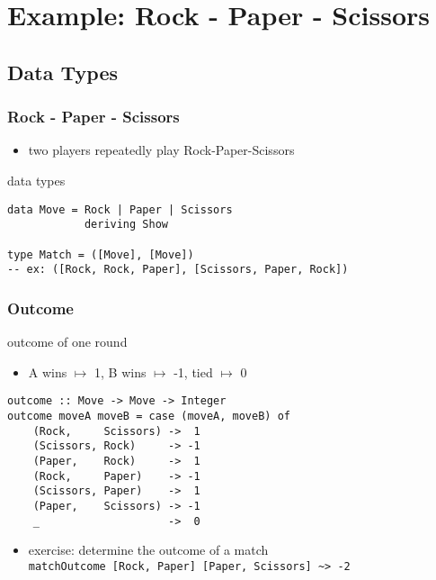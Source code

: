 \documentclass[dvipsnames]{beamer}
\theoremstyle{plain}
\begin{document}
\section{Example: Rock - Paper - Scissors}

\subsection{Data Types}

\begin{frame}[fragile]
  \frametitle{Rock - Paper - Scissors}

  \begin{itemize}
    \item two players repeatedly play Rock-Paper-Scissors
  \end{itemize}

  \begin{exampleblock}{data types}
    \begin{lstlisting}
data Move = Rock | Paper | Scissors
            deriving Show

type Match = ([Move], [Move])
-- ex: ([Rock, Rock, Paper], [Scissors, Paper, Rock])
    \end{lstlisting}
  \end{exampleblock}
\end{frame}

\begin{frame}[fragile]
  \frametitle{Outcome}

  \begin{exampleblock}{outcome of one round}
    \begin{itemize}
      \item A wins $\mapsto$ 1, B wins $\mapsto$ -1, tied $\mapsto$ 0
    \end{itemize}
    \begin{lstlisting}
outcome :: Move -> Move -> Integer
outcome moveA moveB = case (moveA, moveB) of
    (Rock,     Scissors) ->  1
    (Scissors, Rock)     -> -1
    (Paper,    Rock)     ->  1
    (Rock,     Paper)    -> -1
    (Scissors, Paper)    ->  1
    (Paper,    Scissors) -> -1
    _                    ->  0
    \end{lstlisting}
  \end{exampleblock}

  \pause
  \vspace{-12pt}
  \begin{itemize}
    \item exercise: determine the outcome of a match\\
      \lstinline|matchOutcome [Rock, Paper] [Paper, Scissors] ~> -2|
  \end{itemize}
\end{frame}
\end{document}
